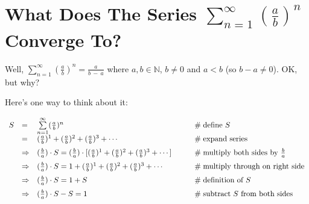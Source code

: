 \documentclass[11pt, oneside]{article}   	%
\begin{document}
\section*{What Does The Series $\sum\limits_{n = 1}^\infty (\frac{a}{b})^n $ Converge To?}

\noindent
Well,  $\sum\limits_{n = 1}^\infty (\frac{a}{b})^n  = \frac{a}{b \:-\: a}$ where $a,b \in \mathbb{N}$, $b \neq 0$ and $a < b$ (so $b - a \neq 0$). OK, but why?

\bigskip
\noindent
 Here's one way to think about it:  
      
\begin{equation*}
\begin{array}{lllll}
S
&=& \sum\limits_{n = 1}^\infty (\frac{a}{b})^n                                                                                                                &\qquad  \mathrel{\#} \text{define $S$}                                          \\ 
\vspace{2.0mm}
&=& (\frac{a}{b})^1 + (\frac{a}{b})^2 + (\frac{a}{b})^3 + \cdots                                                                                      &\qquad  \mathrel{\#} \text{expand series}                                      \\
\vspace{2.0mm}
&\Rightarrow& (\frac{b}{a}) \cdot S = (\frac{b}{a}) \cdot [(\frac{a}{b})^1 + (\frac{a}{b})^2 + (\frac{a}{b})^3 + \cdots ]   &\qquad  \mathrel{\#} \text{multiply both sides by $\frac{b}{a}$}     \\
\vspace{2.0mm}
&\Rightarrow&  (\frac{b}{a}) \cdot S = 1 +(\frac{a}{b})^1 + (\frac{a}{b})^2 + (\frac{a}{b})^3 + \cdots                            &\qquad  \mathrel{\#} \text{multiply through on right side}              \\
\vspace{2.0mm}
&\Rightarrow&  (\frac{b}{a}) \cdot S = 1 + S                                                                                                                &\qquad  \mathrel{\#} \text{definition of $S$}                                   \\
\vspace{2.0mm}
&\Rightarrow&  (\frac{b}{a}) \cdot S - S = 1                                                                                                                 &\qquad  \mathrel{\#} \text{subtract $S$ from both sides}               \\
\vspace{2.0mm}

\end{array}
\end{equation*}
\end{document}

